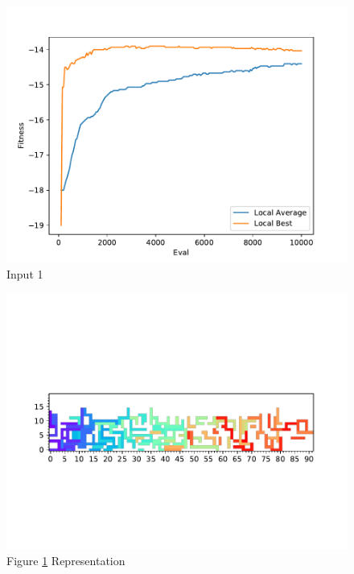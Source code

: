 \documentclass{standalone}
\begin{document}
\begin{figure}[!htb]
	\caption{Input 1}
	\label{fig:graph_1012}
	\includegraphics[width=\textwidth]{../graphs/graphs/1012.pdf}
\end{figure}


\begin{figure}[!htb]
	\caption{Figure \ref{fig:graph_1012} Representation}
	\label{fig:picture_1012}
	\includegraphics[width=\textwidth]{../graphs/picture/1012.pdf}
\end{figure}
\end{document}
